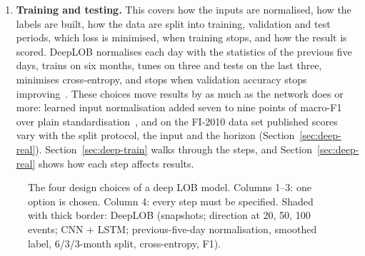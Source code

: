 \begin{enumerate}[leftmargin=1.8em,itemsep=4pt]
  Transformers did not beat the DeepLOB family, and adding attention to the best bilinear network gained
  0.4 of a point~\citep{shabani2022mtabl}. Section~\ref{sec:deep-families} describes the families.
\item \textbf{Training and testing.} This covers how the inputs are normalised, how the labels are built, how
  the data are split into training, validation and test periods, which loss is minimised, when training stops, and how
  the result is scored. DeepLOB normalises each day with the statistics of the previous five days, trains on six months,
  tunes on three and tests on the last three, minimises cross-entropy, and stops when validation accuracy stops
  improving~\citep{zhang2019}. These choices move results by as much as the network does or more: learned input
  normalisation added seven to nine points of macro-F1 over plain standardisation~\citep{september2024edain}, and on the
  FI-2010 data set published scores vary with the split protocol, the input and the horizon (Section~\ref{sec:deep-real}).
  Section~\ref{sec:deep-train} walks through the steps, and Section~\ref{sec:deep-real} shows how each step affects
  results.
\end{enumerate}

\begin{figure}[!htbp]
\centering
{}
\caption{The four design choices of a deep LOB model. Columns 1--3: one option is chosen. Column 4: every step
must be specified. Shaded with thick border: DeepLOB (snapshots; direction at 20, 50, 100 events; CNN + LSTM;
previous-five-day normalisation, smoothed label, 6/3/3-month split, cross-entropy, F1).}
\label{fig:four-decisions}
\end{figure}

